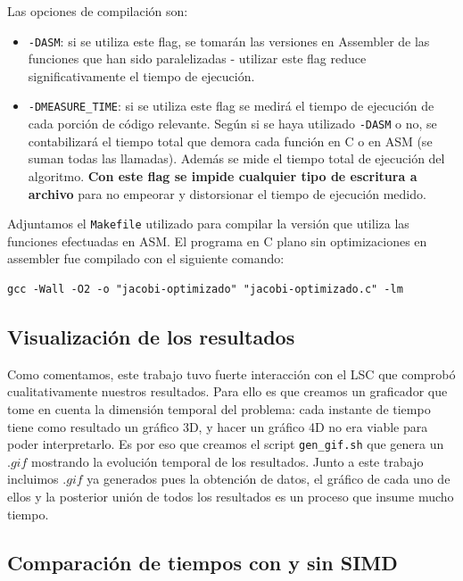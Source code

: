 \documentclass[a4paper]{article}
\begin{document}
Las opciones de compilación son:

\begin{itemize}
\item \texttt{-DASM}: si se utiliza este flag, se tomarán las versiones
en Assembler de las funciones que han sido paralelizadas - utilizar este
flag reduce significativamente el tiempo de ejecución.
\item \texttt{-DMEASURE\_TIME}: si se utiliza este flag se medirá el tiempo
de ejecución de cada porción de código relevante. Según si se haya utilizado
\texttt{-DASM} o no, se contabilizará el tiempo total que demora cada función en C
o en ASM (se suman todas las llamadas). Además se mide el tiempo total
de ejecución del algoritmo. \textbf{Con este flag se impide cualquier tipo de
escritura a archivo} para no empeorar y distorsionar el tiempo de ejecución
medido.
\end{itemize}

Adjuntamos el \texttt{Makefile} utilizado para compilar la versión que
utiliza las funciones efectuadas en ASM. El programa en C plano sin
optimizaciones en assembler fue compilado con el siguiente comando:

\begin{center}
\begin{verbatim}
gcc -Wall -O2 -o "jacobi-optimizado" "jacobi-optimizado.c" -lm
\end{verbatim}
\end{center}

\subsection{Visualización de los resultados}

Como comentamos, este trabajo tuvo fuerte interacción con el LSC que
comprobó cualitativamente nuestros resultados. Para ello es que creamos
un graficador que tome en cuenta la dimensión temporal del problema: 
cada instante de tiempo tiene como resultado un gráfico 3D, y hacer un
gráfico 4D no era viable para poder interpretarlo. Es por eso que
creamos el script \texttt{gen\_gif.sh} que genera un $.gif$ mostrando
la evolución temporal de los resultados. Junto a este trabajo incluimos 
$.gif$ ya generados pues la obtención de datos, el gráfico de cada uno de
ellos y la posterior unión de todos los resultados es un proceso que 
insume mucho tiempo.

\subsection{Comparación de tiempos con y sin SIMD}
\end{document}

